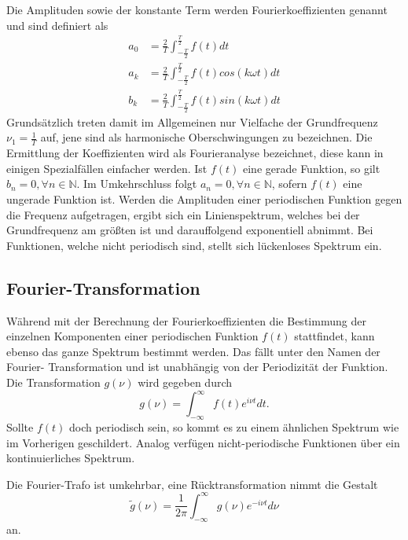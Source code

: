 Die Amplituden sowie der konstante Term werden Fourierkoeffizienten genannt und 
sind definiert als 
\begin{align}
    a_0 &= \frac{2}{T} \int_{-\frac{T}{2}}^{\frac{T}{2}} f(t) dt \label{eqn:4.1} \\
    a_k &= \frac{2}{T} \int_{-\frac{T}{2}}^{\frac{T}{2}} f(t) cos(k \omega t) dt \label{eqn:4.2} \\
    b_k &= \frac{2}{T} \int_{-\frac{T}{2}}^{\frac{T}{2}} f(t) sin(k \omega t) dt \label{eqn:4.3}
\end{align}
Grundsätzlich treten damit im Allgemeinen nur Vielfache der Grundfrequenz 
$\nu_1 = \frac{1}{T}$ auf, jene sind als harmonische Oberschwingungen zu bezeichnen.
Die Ermittlung der Koeffizienten wird als Fourieranalyse bezeichnet, diese kann 
in einigen Spezialfällen einfacher werden. Ist $f(t)$ eine gerade Funktion, so 
gilt $b_n = 0, \forall n \in \mathbb{N}$. Im Umkehrschluss folgt 
$a_n = 0, \forall n \in \mathbb{N}$, sofern $f(t)$ eine ungerade Funktion ist.
Werden die Amplituden einer periodischen Funktion gegen die Frequenz aufgetragen,
ergibt sich ein Linienspektrum, welches bei der Grundfrequenz am größten ist
und darauffolgend exponentiell abnimmt. Bei Funktionen, welche nicht periodisch 
sind, stellt sich lückenloses Spektrum ein.

\subsection{Fourier-Transformation}
Während mit der Berechnung der Fourierkoeffizienten die Bestimmung der einzelnen 
Komponenten einer periodischen Funktion $f(t)$ stattfindet, kann ebenso das 
ganze Spektrum bestimmt werden. Das fällt unter den Namen der Fourier-
Transformation und ist unabhängig von der Periodizität der Funktion. Die 
Transformation $g(\nu)$ wird gegeben durch
\begin{equation}
    \label{eqn:5}
    g(\nu) = \int_{-\infty}^\infty f(t) e^{i \nu t} dt.
\end{equation}
Sollte $f(t)$ doch periodisch sein, so kommt es zu einem ähnlichen Spektrum 
wie im Vorherigen geschildert. Analog verfügen nicht-periodische Funktionen 
über ein kontinuierliches Spektrum.

Die Fourier-Trafo ist umkehrbar, eine Rücktransformation nimmt die Gestalt
\begin{equation}
    \label{eqn:6}
    \tilde{g}(\nu) = \frac{1}{2 \pi} \int_{-\infty}^\infty g(\nu) e^{-i \nu t} d\nu
\end{equation}
an.

